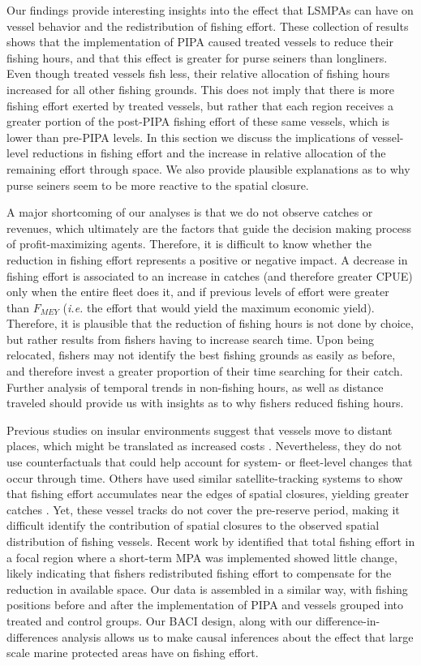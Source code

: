\documentclass[11pt,]{article}
\begin{document}
Our findings provide interesting insights into the effect that LSMPAs
can have on vessel behavior and the redistribution of fishing effort.
These collection of results shows that the implementation of PIPA caused
treated vessels to reduce their fishing hours, and that this effect is
greater for purse seiners than longliners. Even though treated vessels
fish less, their relative allocation of fishing hours increased for all
other fishing grounds. This does not imply that there is more fishing
effort exerted by treated vessels, but rather that each region receives
a greater portion of the post-PIPA fishing effort of these same vessels,
which is lower than pre-PIPA levels. In this section we discuss the
implications of vessel-level reductions in fishing effort and the
increase in relative allocation of the remaining effort through space.
We also provide plausible explanations as to why purse seiners seem to
be more reactive to the spatial closure.

A major shortcoming of our analyses is that we do not observe catches or
revenues, which ultimately are the factors that guide the decision
making process of profit-maximizing agents. Therefore, it is difficult
to know whether the reduction in fishing effort represents a positive or
negative impact. A decrease in fishing effort is associated to an
increase in catches (and therefore greater CPUE) only when the entire
fleet does it, and if previous levels of effort were greater than
\(F_{MEY}\) (\emph{i.e.} the effort that would yield the maximum
economic yield). Therefore, it is plausible that the reduction of
fishing hours is not done by choice, but rather results from fishers
having to increase search time. Upon being relocated, fishers may not
identify the best fishing grounds as easily as before, and therefore
invest a greater proportion of their time searching for their catch.
Further analysis of temporal trends in non-fishing hours, as well as
distance traveled should provide us with insights as to why fishers
reduced fishing hours.

Previous studies on insular environments suggest that vessels move to
distant places, which might be translated as increased costs
\citep{stevenson_2013}. Nevertheless, they do not use counterfactuals
that could help account for system- or fleet-level changes that occur
through time. Others have used similar satellite-tracking systems to
show that fishing effort accumulates near the edges of spatial closures,
yielding greater catches \citep{murawski_2005}. Yet, these vessel tracks
do not cover the pre-reserve period, making it difficult identify the
contribution of spatial closures to the observed spatial distribution of
fishing vessels. Recent work by \citet{elahi_2018} identified that total
fishing effort in a focal region where a short-term MPA was implemented
showed little change, likely indicating that fishers redistributed
fishing effort to compensate for the reduction in available space. Our
data is assembled in a similar way, with fishing positions before and
after the implementation of PIPA and vessels grouped into treated and
control groups. Our BACI design, along with our
difference-in-differences analysis allows us to make causal inferences
about the effect that large scale marine protected areas have on fishing
effort.
\end{document}
